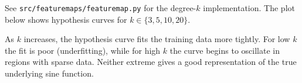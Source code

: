 \begin{answer}
See \texttt{src/featuremaps/featuremap.py} for the degree-$k$ implementation. The plot below shows hypothesis curves for $k\in\{3,5,10,20\}$.

As $k$ increases, the hypothesis curve fits the training data more tightly. For low $k$ the fit is poor (underfitting), while for high $k$ the curve begins to oscillate in regions with sparse data. Neither extreme gives a good representation of the true underlying sine function.
\end{answer}

